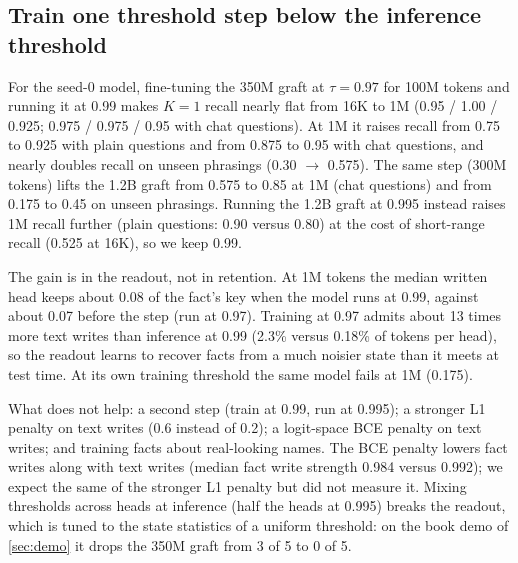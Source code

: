 \documentclass[11pt]{article}
\newcommand{\tauw}{\tau}
\begin{document}
\subsection{Train one threshold step below the inference threshold}
\label{sec:curriculum}
For the seed-0 model, fine-tuning the 350M graft at $\tauw = 0.97$ for 100M tokens and running it at 0.99 makes $K = 1$ recall nearly flat from 16K to 1M (0.95 / 1.00 / 0.925; 0.975 / 0.975 / 0.95 with chat questions). At 1M it raises recall from 0.75 to 0.925 with plain questions and from 0.875 to 0.95 with chat questions, and nearly doubles recall on unseen phrasings (0.30 $\to$ 0.575). The same step (300M tokens) lifts the 1.2B graft from 0.575 to 0.85 at 1M (chat questions) and from 0.175 to 0.45 on unseen phrasings. Running the 1.2B graft at 0.995 instead raises 1M recall further (plain questions: 0.90 versus 0.80) at the cost of short-range recall (0.525 at 16K), so we keep 0.99.

The gain is in the readout, not in retention. At 1M tokens the median written head keeps about 0.08 of the fact's key when the model runs at 0.99, against about 0.07 before the step (run at 0.97). Training at 0.97 admits about 13 times more text writes than inference at 0.99 (2.3\% versus 0.18\% of tokens per head), so the readout learns to recover facts from a much noisier state than it meets at test time. At its own training threshold the same model fails at 1M (0.175).

What does not help: a second step (train at 0.99, run at 0.995); a stronger L1 penalty on text writes (0.6 instead of 0.2); a logit-space BCE penalty on text writes; and training facts about real-looking names. The BCE penalty lowers fact writes along with text writes (median fact write strength 0.984 versus 0.992); we expect the same of the stronger L1 penalty but did not measure it. Mixing thresholds across heads at inference (half the heads at 0.995) breaks the readout, which is tuned to the state statistics of a uniform threshold: on the book demo of \cref{sec:demo} it drops the 350M graft from 3 of 5 to 0 of 5.
\end{document}
